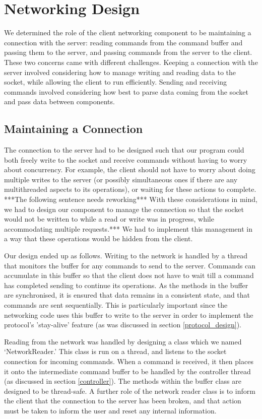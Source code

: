 \section{Networking Design}
\label{networking_design}

We determined the role of the client networking component to be maintaining a connection with the server: reading commands from the command buffer and passing them to the server, and passing commands from the server to the client. These two concerns came with different challenges. Keeping a connection with the server involved considering how to manage writing and reading data to the socket, while allowing the client to run efficiently. Sending and receiving commands involved considering how best to parse data coming from the socket and pass data between components.

\subsection {Maintaining a Connection}

The connection to the server had to be designed such that our program could both freely write to the socket and receive commands without having to worry about concurrency. For example, the client should not have to worry about doing multiple writes to the server (or possibly simultaneous ones if there are any multithreaded aspects to its operations), or waiting for these actions to complete. ***The following sentence needs reworking*** With these considerations in mind, we had to design our component to manage the connection so that the socket would not be written to while a read or write was in progress, while accommodating multiple requests.*** We had to implement this management in a way that these operations would be hidden from the client.

Our design ended up as follows. Writing to the network is handled by a thread that monitors the buffer for any commands to send to the server. Commands can accumulate in this buffer so that the client does not have to wait till a command has completed sending to continue its operations. As the methods in the buffer are synchronised, it is ensured that data remains in a consistent state, and that commands are sent sequentially. This is particularly important since the networking code uses this buffer to write to the server in order to implement the protocol's 'stay-alive' feature (as was discussed in section \ref{protocol_design}).

Reading from the network was handled by designing a class which we named `NetworkReader.' This class is run on a thread, and listens to the socket connection for incoming commands. When a command is received, it then places it onto the intermediate command buffer to be handled by the controller thread (as discussed in section \ref{controller}). The methods within the buffer class are designed to be thread-safe. A further role of the network reader class is to inform the client that the connection to the server has been broken, and that action must be taken to inform the user and reset any internal information.

